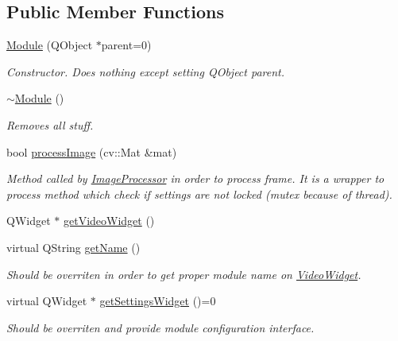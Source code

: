 \subsection*{Public Member Functions}
\begin{DoxyCompactItemize}
\item 
\hyperlink{class_module_a898c66ef74395bb450900d479b51fc21}{Module} (QObject $\ast$parent=0)
\begin{DoxyCompactList}\small\item\em Constructor. Does nothing except setting QObject parent. \item\end{DoxyCompactList}\item 
\hypertarget{class_module_a7c9d9c096786d127590fdd8aa2b7d681}{
\hyperlink{class_module_a7c9d9c096786d127590fdd8aa2b7d681}{$\sim$Module} ()}
\label{dd/df9/class_module_a7c9d9c096786d127590fdd8aa2b7d681}

\begin{DoxyCompactList}\small\item\em Removes all stuff. \item\end{DoxyCompactList}\item 
bool \hyperlink{class_module_a030fde5f794abbc63e33286e40a0192c}{processImage} (cv::Mat \&mat)
\begin{DoxyCompactList}\small\item\em Method called by \hyperlink{class_image_processor}{ImageProcessor} in order to process frame. It is a wrapper to process method which check if settings are not locked (mutex because of thread). \item\end{DoxyCompactList}\item 
QWidget $\ast$ \hyperlink{class_module_acbca15013c486ec2a6cc2391e4170880}{getVideoWidget} ()
\item 
virtual QString \hyperlink{class_module_a1cf07480fdd9a964eb8375bf2fb549b0}{getName} ()
\begin{DoxyCompactList}\small\item\em Should be overriten in order to get proper module name on \hyperlink{class_video_widget}{VideoWidget}. \item\end{DoxyCompactList}\item 
virtual QWidget $\ast$ \hyperlink{class_module_a7a6a83882ef0d9aec623577884ce2fb5}{getSettingsWidget} ()=0
\begin{DoxyCompactList}\small\item\em Should be overriten and provide module configuration interface. \item\end{DoxyCompactList}\end{DoxyCompactItemize}
